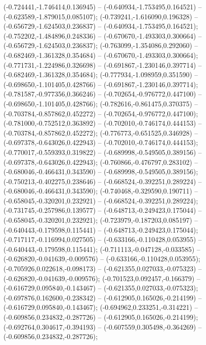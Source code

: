  (-0.724441,-1.746414,0.136945) -- (-0.640934,-1.753495,0.164521) -- (-0.623589,-1.879015,0.085107);
 (-0.739241,-1.616090,0.196328) -- (-0.656729,-1.624503,0.236837) -- (-0.640934,-1.753495,0.164521);
 (-0.752202,-1.484896,0.248336) -- (-0.670670,-1.493303,0.300664) -- (-0.656729,-1.624503,0.236837);
 (-0.763099,-1.354086,0.292060) -- (-0.682469,-1.361328,0.354684) -- (-0.670670,-1.493303,0.300664);
 (-0.771731,-1.224986,0.326698) -- (-0.691867,-1.230146,0.397714) -- (-0.682469,-1.361328,0.354684);
 (-0.777934,-1.098959,0.351590) -- (-0.698650,-1.101405,0.428766) -- (-0.691867,-1.230146,0.397714);
 (-0.781587,-0.977356,0.366246) -- (-0.702654,-0.976772,0.447100) -- (-0.698650,-1.101405,0.428766);
 (-0.782616,-0.861475,0.370375) -- (-0.703784,-0.857862,0.452272) -- (-0.702654,-0.976772,0.447100);
 (-0.781000,-0.752512,0.363892) -- (-0.702010,-0.746174,0.444153) -- (-0.703784,-0.857862,0.452272);
 (-0.776773,-0.651525,0.346928) -- (-0.697378,-0.643026,0.422943) -- (-0.702010,-0.746174,0.444153);
 (-0.770017,-0.559393,0.319822) -- (-0.689998,-0.549505,0.389156) -- (-0.697378,-0.643026,0.422943);
 (-0.760866,-0.476797,0.283102) -- (-0.680046,-0.466431,0.343590) -- (-0.689998,-0.549505,0.389156);
 (-0.750213,-0.402275,0.238646) -- (-0.668524,-0.392251,0.289224) -- (-0.680046,-0.466431,0.343590);
 (-0.740468,-0.329590,0.190711) -- (-0.658045,-0.320201,0.232921) -- (-0.668524,-0.392251,0.289224);
 (-0.731745,-0.257986,0.139577) -- (-0.648713,-0.249423,0.175044) -- (-0.658045,-0.320201,0.232921);
 (-0.723979,-0.187203,0.085197) -- (-0.640443,-0.179598,0.115441) -- (-0.648713,-0.249423,0.175044);
 (-0.717117,-0.116994,0.027505) -- (-0.633166,-0.110428,0.053955) -- (-0.640443,-0.179598,0.115441);
 (-0.711113,-0.047128,-0.033585) -- (-0.626820,-0.041639,-0.009576) -- (-0.633166,-0.110428,0.053955);
 (-0.705926,0.022618,-0.098173) -- (-0.621355,0.027033,-0.075323) -- (-0.626820,-0.041639,-0.009576);
 (-0.701523,0.092457,-0.166379) -- (-0.616729,0.095840,-0.143467) -- (-0.621355,0.027033,-0.075323);
 (-0.697876,0.162600,-0.238342) -- (-0.612905,0.165026,-0.214199) -- (-0.616729,0.095840,-0.143467);
 (-0.694962,0.233251,-0.314221) -- (-0.609856,0.234832,-0.287726) -- (-0.612905,0.165026,-0.214199);
 (-0.692764,0.304617,-0.394193) -- (-0.607559,0.305498,-0.364269) -- (-0.609856,0.234832,-0.287726);
